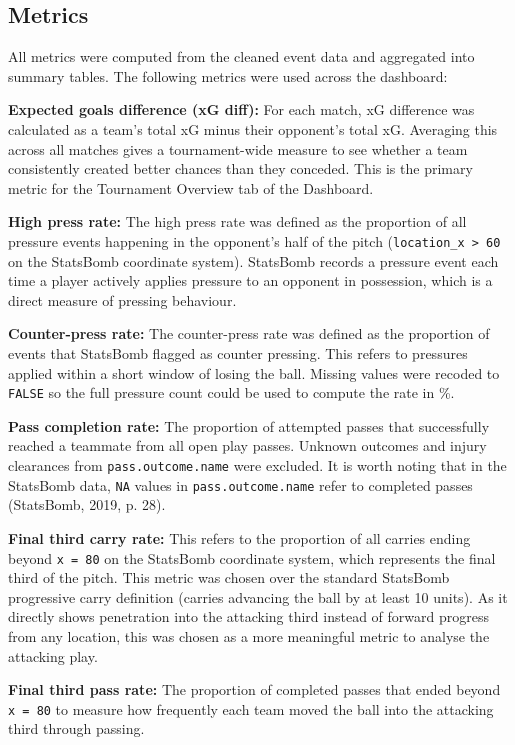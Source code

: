 \documentclass[
  11pt,
  a4paper,
  DIV=11,
  numbers=noendperiod]{scrartcl}
\begin{document}
\subsection{Metrics}\label{metrics}

All metrics were computed from the cleaned event data and aggregated
into summary tables. The following metrics were used across the
dashboard:

\textbf{Expected goals difference (xG diff):} For each match, xG
difference was calculated as a team's total xG minus their opponent's
total xG. Averaging this across all matches gives a tournament-wide
measure to see whether a team consistently created better chances than
they conceded. This is the primary metric for the Tournament Overview
tab of the Dashboard.

\textbf{High press rate:} The high press rate was defined as the
proportion of all pressure events happening in the opponent's half of
the pitch (\texttt{location\_x\ \textgreater{}\ 60} on the StatsBomb
coordinate system). StatsBomb records a pressure event each time a
player actively applies pressure to an opponent in possession, which is
a direct measure of pressing behaviour.

\textbf{Counter-press rate:} The counter-press rate was defined as the
proportion of events that StatsBomb flagged as counter pressing. This
refers to pressures applied within a short window of losing the ball.
Missing values were recoded to \texttt{FALSE} so the full pressure count
could be used to compute the rate in \%.

\textbf{Pass completion rate:} The proportion of attempted passes that
successfully reached a teammate from all open play passes. Unknown
outcomes and injury clearances from \texttt{pass.outcome.name} were
excluded. It is worth noting that in the StatsBomb data, \texttt{NA}
values in \texttt{pass.outcome.name} refer to completed passes
(StatsBomb, 2019, p. 28).

\textbf{Final third carry rate:} This refers to the proportion of all
carries ending beyond \texttt{x\ =\ 80} on the StatsBomb coordinate
system, which represents the final third of the pitch. This metric was
chosen over the standard StatsBomb progressive carry definition (carries
advancing the ball by at least 10 units). As it directly shows
penetration into the attacking third instead of forward progress from
any location, this was chosen as a more meaningful metric to analyse the
attacking play.

\textbf{Final third pass rate:} The proportion of completed passes that
ended beyond \texttt{x\ =\ 80} to measure how frequently each team moved
the ball into the attacking third through passing.
\end{document}
